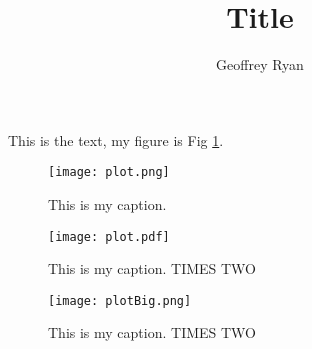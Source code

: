 \documentclass{article}
\begin{document}
\title{Title}
\author{Geoffrey Ryan}

This is the text, my figure is Fig \ref{fi:dataplot}.

\begin{figure}
	\begin{center}
		\texttt{[image: plot.png]}
		\caption{This is my caption.  \label{fi:dataplot}}
	\end{center}
\end{figure}

\begin{figure}
	\begin{center}
		\texttt{[image: plot.pdf]}
		\caption{This is my caption. TIMES TWO  \label{fi:dataplotNice}}
	\end{center}
\end{figure}
\begin{figure}
	\begin{center}
		\texttt{[image: plotBig.png]}
		\caption{This is my caption. TIMES TWO  \label{fi:dataplotNice}}
	\end{center}
\end{figure}
\end{document}
